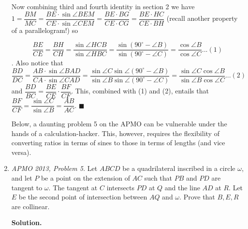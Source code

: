\documentclass[11pt,a4paper]{article}
\begin{document}
\begin{enumerate}
Now combining third and fourth identity in section 2 we have $1=\dfrac{BM}{MC}=\dfrac{BE\cdot\sin\angle BEM}{CE\cdot\sin\angle CEM}=\dfrac{BE\cdot BG}{CE\cdot CG}=\dfrac{BE\cdot HC}{CE\cdot BH}$ (recall another property of a parallelogram!) so

 $$\frac{BE}{CE}=\frac{BH}{CH}=\frac{\sin\angle HCB}{\sin\angle HBC}=\frac{\sin (90^{\circ}-\angle B)}{\sin (90^{\circ}-\angle C)}=\frac{\cos\angle B}{\cos\angle C}...(1)$$. 
Also notice that 
$$\frac{BD}{DC}=\frac{AB\cdot\sin\angle BAD}{CA\cdot\sin\angle CAD}=\frac{\sin\angle C\sin\angle (90^{\circ}-\angle B)}{\sin\angle B\sin\angle (90^{\circ}-\angle C)}=\frac{\sin\angle C\cos\angle B}{\sin\angle B\cos\angle C}...(2)$$ and $\dfrac{BD}{BC}=\dfrac{BE}{CE}\cdot \dfrac{BF}{CF}$. This, combined with (1) and (2), entails that $\dfrac{BF}{CF}=\dfrac{\sin\angle C}{\sin\angle B}=\dfrac{AB}{AC}.$ $\blacksquare$

Below, a daunting problem 5 on the APMO can be vulnerable under the hands of a calculation-hacker. This, however, requires the flexibility of converting ratios in terms of sines to those in terms of lengths (and vice versa).

\item\emph {APMO 2013, Problem 5.} Let $ABCD$ be a quadrilateral inscribed in a circle $\omega$, and let $P$ be a point on the extension of $AC$ such that $PB$ and $PD$ are tangent to $\omega$. The tangent at $C$ intersects $PD$ at $Q$ and the line $AD$ at $R$.  Let $E$ be the second point of intersection between $AQ$ and $\omega$. Prove that $B, E, R$ are collinear.

\textbf {Solution.}


\end{enumerate}
\end{document}
